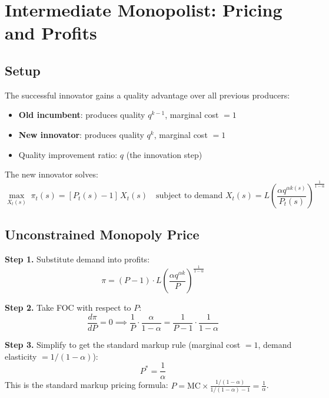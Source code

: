\documentclass[a4paper,11pt]{article}
\begin{document}
\clearpage

\section{Intermediate Monopolist: Pricing and Profits}

\subsection*{Setup}

The successful innovator gains a quality advantage over all previous producers:
\begin{itemize}
    \item \textbf{Old incumbent}: produces quality $q^{k-1}$, marginal cost $= 1$
    \item \textbf{New innovator}: produces quality $q^k$, marginal cost $= 1$
    \item Quality improvement ratio: $q$ (the innovation step)
\end{itemize}

The new innovator solves:
\[
\max_{X_t(s)} \; \pi_t(s) = [P_t(s) - 1]\, X_t(s) \quad \text{subject to demand } X_t(s) = L\left(\frac{\alpha q^{\alpha k(s)}}{P_t(s)}\right)^{\frac{1}{1-\alpha}}
\]

\subsection*{Unconstrained Monopoly Price}

\begin{derivationbox}[title={Derivation: Unconstrained Monopoly Pricing}]
\textbf{Step 1.} Substitute demand into profits:
\[
\pi = (P - 1) \cdot L\left(\frac{\alpha q^{\alpha k}}{P}\right)^{\frac{1}{1-\alpha}}
\]

\textbf{Step 2.} Take FOC with respect to $P$:
\[
\frac{d\pi}{dP} = 0 \implies \frac{1}{P} \cdot \frac{\alpha}{1-\alpha} = \frac{1}{P - 1} \cdot \frac{1}{1-\alpha}
\]

\textbf{Step 3.} Simplify to get the standard markup rule (marginal cost $= 1$, demand elasticity $= 1/(1-\alpha)$):
\[
P^* = \frac{1}{\alpha}
\]
This is the standard markup pricing formula: $P = \text{MC} \times \frac{1/(1-\alpha)}{1/(1-\alpha)-1} = \frac{1}{\alpha}$.
\end{derivationbox}
\end{document}
